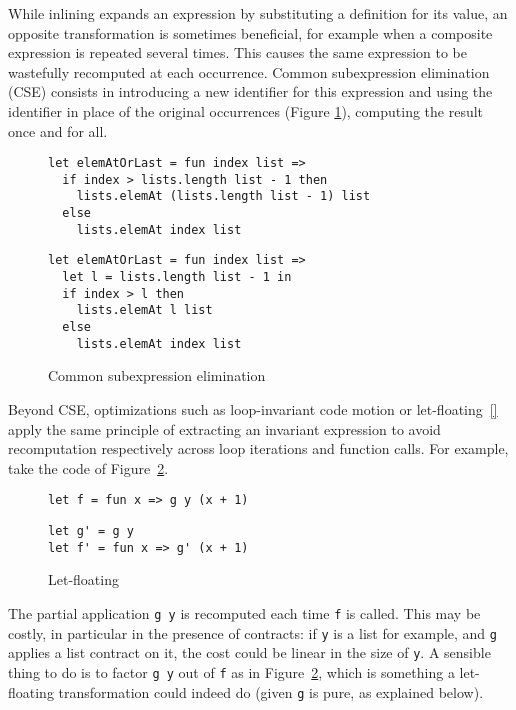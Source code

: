 \documentclass[sigplan,10pt,review,anonymous]{acmart}
\begin{document}
While inlining expands an expression by substituting a definition for its value,
an opposite transformation is sometimes beneficial, for example when a composite
expression is repeated several times. This causes the same expression to be
wastefully recomputed at each occurrence. Common subexpression elimination (CSE)
consists in introducing a new identifier for this expression and using the
identifier in place of the original occurrences
(Figure \ref{fig:optimizations-cse-ex}), computing the result once and for all.

\begin{figure}[h]
  \begin{center}
\begin{lstlisting}[language=nickel,title={Source program}]
let elemAtOrLast = fun index list =>
  if index > lists.length list - 1 then
    lists.elemAt (lists.length list - 1) list
  else
    lists.elemAt index list
\end{lstlisting}
\begin{lstlisting}[language=nickel,title={Optimized program}]
let elemAtOrLast = fun index list =>
  let l = lists.length list - 1 in
  if index > l then
    lists.elemAt l list
  else
    lists.elemAt index list
\end{lstlisting}
  \end{center}
\caption{Common subexpression elimination}
\label{fig:optimizations-cse-ex}
\end{figure}

Beyond CSE, optimizations such as loop-invariant code motion or
let-floating~\ref{} apply the same principle of extracting an invariant
expression to avoid recomputation respectively across loop iterations and
function calls. For example, take the code of
Figure~\ref{fig:optimizations-let-floating-ex}.

\begin{figure}
  \begin{center}
\begin{lstlisting}[language=nickel,title={Source program}]
let f = fun x => g y (x + 1)
\end{lstlisting}
\begin{lstlisting}[language=nickel,title={Optimized program}]
let g' = g y
let f' = fun x => g' (x + 1)
\end{lstlisting}
  \end{center}
\caption{Let-floating}
\label{fig:optimizations-let-floating-ex}
\end{figure}

The partial application \lstinline+g y+ is recomputed each time \lstinline+f+ is
called. This may be costly, in particular in the presence of contracts: if
\lstinline+y+ is a list for example, and \lstinline+g+ applies a list contract
on it, the cost could be linear in the size of \lstinline+y+. A sensible thing
to do is to factor \lstinline+g y+ out of \lstinline+f+ as in
Figure~\ref{fig:optimizations-let-floating-ex}, which is something a
let-floating transformation could indeed do (given \lstinline+g+ is pure, as
explained below).
\end{document}
